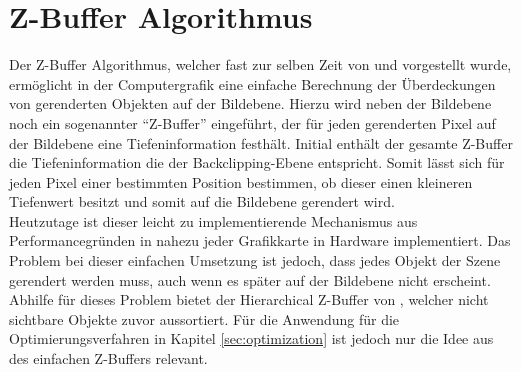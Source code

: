 
\section{Z-Buffer Algorithmus} \label{sec:z-buffer}

Der Z-Buffer Algorithmus, welcher fast zur selben Zeit von \citet{straber1974schnelle} und \citet{catmull1974subdivision} vorgestellt wurde, ermöglicht in der Computergrafik eine einfache Berechnung der Überdeckungen von gerenderten Objekten auf der Bildebene. Hierzu wird neben der Bildebene noch ein sogenannter \enquote{Z-Buffer} eingeführt, der für jeden gerenderten Pixel auf der Bildebene eine Tiefeninformation festhält. Initial enthält der gesamte Z-Buffer die Tiefeninformation die der Backclipping-Ebene entspricht. Somit lässt sich für jeden Pixel einer bestimmten Position bestimmen, ob dieser einen kleineren Tiefenwert besitzt und somit auf die Bildebene gerendert wird. \\

Heutzutage ist dieser leicht zu implementierende Mechanismus aus Performancegründen in nahezu jeder Grafikkarte in Hardware implementiert. Das Problem bei dieser einfachen Umsetzung ist jedoch, dass jedes Objekt der Szene gerendert werden muss, auch wenn es später auf der Bildebene nicht erscheint. Abhilfe für dieses Problem bietet der Hierarchical Z-Buffer von \citet{greene1993hierarchical}, welcher nicht sichtbare Objekte zuvor aussortiert. Für die Anwendung für die Optimierungsverfahren in Kapitel \ref{sec:optimization} ist jedoch nur die Idee aus des einfachen Z-Buffers relevant.